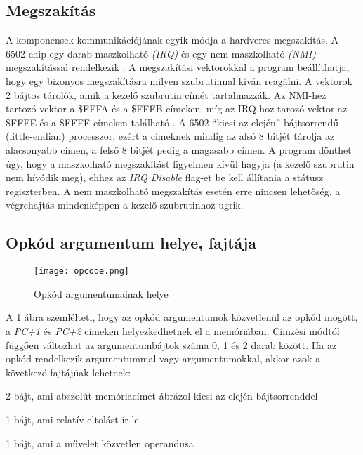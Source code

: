 \subsection{Megszakítás}
A komponensek kommunikációjának egyik módja a hardveres megszakítás.
A 6502 chip egy darab maszkolható \emph{(IRQ)} és egy nem maszkolható \emph{(NMI)} megszakítással rendelkezik \cite{6502desc}.
A megszakítási vektorokkal a program beállíthatja, hogy egy bizonyos megszakításra milyen szubrutinnal kíván reagálni. A vektorok 2 bájtos tárolók, amik a kezelő szubrutin címét tartalmazzák. Az NMI-hez tartozó vektor a \$FFFA és a \$FFFB címeken, míg az IRQ-hoz tarozó vektor az \$FFFE és a \$FFFF címeken található \cite{cpumem}. A 6502 ``kicsi az elején'' bájtsorrendű (little-endian) processzor, ezért a címeknek mindig az alsó 8 bitjét tárolja az alacsonyabb címen, a felső 8 bitjét pedig a magasabb címen.
A program dönthet úgy, hogy a maszkolható megszakítást figyelmen kívül hagyja (a kezelő szubrutin nem hívódik meg), ehhez az \emph{IRQ Disable} flag-et be kell állítania a státusz regiszterben. A nem maszkolható megszakítás esetén erre nincsen lehetőség, a végrehajtás mindenképpen a kezelő szubrutinhoz ugrik.

\subsection{Opkód argumentum helye, fajtája}

\begin{figure}[H]
	\centering
	\texttt{[image: opcode.png]}
	\caption{Opkód argumentumainak helye}
	\label{fig:argplacement}
\end{figure}

A \ref{fig:argplacement} ábra szemlélteti, hogy az opkód argumentumok közvetlenül az opkód mögött, a \emph{PC+1} és \emph{PC+2} címeken helyezkedhetnek el a memóriában. Címzési módtól függően változhat az argumentumbájtok száma 0, 1 és 2 darab között.
Ha az opkód rendelkezik argumentummal vagy argumentumokkal, akkor azok a következő fajtájúak lehetnek:

\begin{compactitem}
	\item 2 bájt, ami abszolút memóriacímet ábrázol kicsi-az-elején bájtsorrenddel 
	\item 1 bájt, ami relatív eltolást ír le
	\item 1 bájt, ami a művelet közvetlen operandusa
\end{compactitem}

